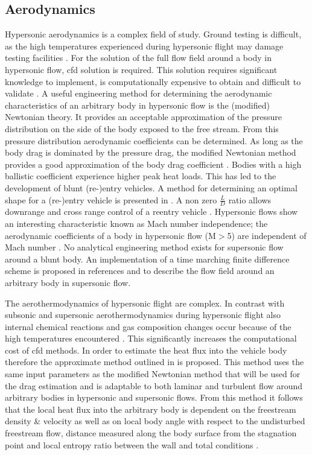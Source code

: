 \subsection{Aerodynamics} \label{sec:aero}
Hypersonic aerodynamics is a complex field of study. Ground testing is difficult, as the high temperatures experienced during hypersonic flight may damage testing facilities \cite{AndersonJr.2006, Bertin1994}. For the solution of the full flow field around a body in hypersonic flow, \gls{cfd} solution is required. This solution requires significant knowledge to implement, is computationally expensive to obtain and difficult to validate \cite{AndersonJr.2006, Bertin1994}. A useful engineering method for determining the aerodynamic characteristics of an arbitrary body in hypersonic flow is the (modified) Newtonian theory. It provides an acceptable approximation of the pressure distribution on the side of the body exposed to the free stream. From this pressure distribution aerodynamic coefficients can be determined. As long as the body drag is dominated by the pressure drag, the modified Newtonian method provides a good approximation of the body drag coefficient \cite{AndersonJr.2006, Bertin1994, Bertin2006}. Bodies with a high ballistic coefficient experience higher peak heat loads. This has led to the development of blunt (re-)entry vehicles\cite{Bertin1994,Theisinger2009}. A method for determining an optimal shape for a (re-)entry vehicle is presented in \cite{Theisinger2009}. A non zero $\frac{L}{D}$ ratio allows downrange and cross range control of a reentry vehicle \cite{Theisinger2009}. Hypersonic flows show an interesting characteristic known as Mach number independence; the aerodynamic coefficients of a body in hypersonic flow (M$>$5) are independent of Mach number \cite{Bertin1994,AndersonJr.2007,Hollis}. No analytical engineering method exists for supersonic flow around a blunt body. An implementation of a time marching finite difference scheme is proposed in references \cite{AndersonJr.2007} and \cite{AndersonJr.2006} to describe the flow field around an arbitrary body in supersonic flow. 

The aerothermodynamics of hypersonic flight are complex. In contrast with subsonic and supersonic aerothermodynamics during hypersonic flight also internal chemical reactions and gas composition changes occur  because of the high temperatures encountered \cite{AndersonJr.2006}. This significantly increases the computational cost of \gls{cfd} methods. In order to estimate the heat flux into the vehicle body therefore the approximate method outlined in \cite{Tauber1986} \cite{AndersonJr.2006} is proposed. This method uses the same input parameters as the modified Newtonian method that will be used for the drag estimation and is adaptable to both laminar and turbulent flow around arbitrary bodies in hypersonic and supersonic flows. From this method it follows that the local heat flux into the arbitrary body is dependent on the freestream density \& velocity as well as on local body angle with respect to the undisturbed freestream flow, distance measured along the body surface from the stagnation point and local entropy ratio between the wall and total conditions \cite{Tauber1986, AndersonJr.2006}.
